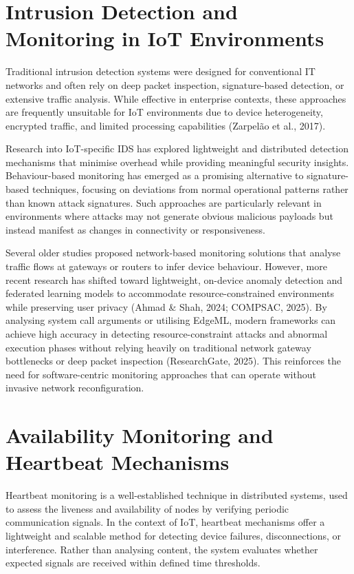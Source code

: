 \section{Intrusion Detection and Monitoring in IoT Environments}

Traditional intrusion detection systems were designed for conventional IT networks and often rely on deep packet inspection, signature-based detection, or extensive traffic analysis. While effective in enterprise contexts, these approaches are frequently unsuitable for IoT environments due to device heterogeneity, encrypted traffic, and limited processing capabilities (Zarpelão et al., 2017).

Research into IoT-specific IDS has explored lightweight and distributed detection mechanisms that minimise overhead while providing meaningful security insights. Behaviour-based monitoring has emerged as a promising alternative to signature-based techniques, focusing on deviations from normal operational patterns rather than known attack signatures. Such approaches are particularly relevant in environments where attacks may not generate obvious malicious payloads but instead manifest as changes in connectivity or responsiveness.

Several older studies proposed network-based monitoring solutions that analyse traffic flows at gateways or routers to infer device behaviour. However, more recent research has shifted toward lightweight, on-device anomaly detection and federated learning models to accommodate resource-constrained environments while preserving user privacy (Ahmad \& Shah, 2024; COMPSAC, 2025). By analysing system call arguments or utilising EdgeML, modern frameworks can achieve high accuracy in detecting resource-constraint attacks and abnormal execution phases without relying heavily on traditional network gateway bottlenecks or deep packet inspection (ResearchGate, 2025). This reinforces the need for software-centric monitoring approaches that can operate without invasive network reconfiguration.

\section{Availability Monitoring and Heartbeat Mechanisms}

Heartbeat monitoring is a well-established technique in distributed systems, used to assess the liveness and availability of nodes by verifying periodic communication signals. In the context of IoT, heartbeat mechanisms offer a lightweight and scalable method for detecting device failures, disconnections, or interference. Rather than analysing content, the system evaluates whether expected signals are received within defined time thresholds.

